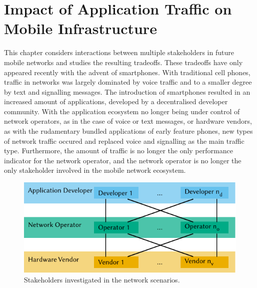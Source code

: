 \chapter{Impact of Application Traffic on Mobile Infrastructure}\label{chap:network}
This chapter considers interactions between multiple stakeholders in future mobile networks and studies the resulting tradeoffs.
These tradeoffs have only appeared recently with the advent of smartphones.
With traditional cell phones, traffic in networks was largely dominated by voice traffic and to a smaller degree by text and signalling messages.
The introduction of smartphones resulted in an increased amount of applications, developed by a decentralised developer community.
With the application ecosystem no longer being under control of network operators, as in the case of voice or text messages, or hardware vendors, as with the rudamentary bundled applications of early feature phones, new types of network traffic occured and replaced voice and signalling as the main traffic type.
Furthermore, the amount of traffic is no longer the only performance indicator for the network operator, and the network operator is no longer the only stakeholder involved in the mobile network ecosystem.

\begin{figure}
  \centering
  \includegraphics{network/figures/stakeholders}
  \caption{Stakeholders investigated in the network scenarios.}
  \label{fig:network:stakeholders}
\end{figure}

